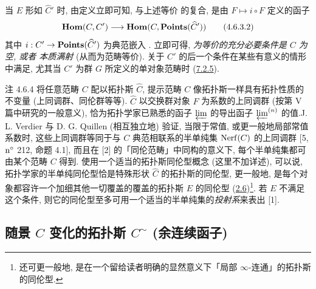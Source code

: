 当 $E$ 形如 $\widehat{C}'$ 时, 由定义立即可知,  与上述等价  的复合, 是由 $F\mapsto i\circ F$ 定义的函子
\begin{equation*}
\operatorname{\mathbf{Hom}}(C,C')\longrightarrow
\operatorname{\mathbf{Hom}}(C,\operatorname{\mathbf{Points}}(\widehat{C}'))\tag{4.6.3.2}
\end{equation*}
其中 $i:C'\rightarrow\operatorname{\mathbf{Points}}(\widehat{C}')$ 为典范嵌入 . 立即可得, \emph{ 为等价的充分必要条件是 $C$ 为空, 或者  本质满射} (从而为范畴等价). 关于 $C'$ 的后一个条件在某些有意义的情形中满足, 尤其当 $C'$ 为群 $G$ 所定义的单对象范畴时 (\hyperref[IV.subsubsec7.2.5]{7.2.5}).





\begin{enonce*}[remark]{注 4.6.4}
将任意范畴 $C$ 配以拓扑斯 $\widehat{C}$, 提示范畴 $C$ 像拓扑斯一样具有拓扑性质的不变量 (上同调群、同伦群等等). $\widehat{C}$ 以交换群对象 $F$ 为系数的上同调群 (按第 V 篇中研究的一般意义), 恰为拓扑学家已熟悉的函子 $\varprojlim$ 的导出函子 $\varprojlim^{(n)}$ 的值.\pageoriginale J. L. Verdier 与 D. G. Quillen (相互独立地) 验证, 当限于常值, 或更一般地局部常值系数时, 这些上同调群等同于与 $C$ 典范相联系的半单纯集 $\operatorname{Nerf}(C)$ 的上同调群 [5, ${\rm n^{\circ}}$ 212, 命题 4.1], 而且在 [2] 的「同伦范畴」中同构的意义下, 每个半单纯集都可由某个范畴 $C$ 得到. 使用一个适当的拓扑斯同伦型概念 (这里不加详述), 可以说, 拓扑学家的半单纯同伦型恰是特殊形状 $\widehat{C}$ 的拓扑斯的同伦型, 更一般地, 是每个对象都容许一个加细其他一切覆盖的覆盖的拓扑斯 $E$ 的同伦型 (\hyperref[IV.subsec2.6]{2.6})\footnote[1]{还可更一般地, 是在一个留给读者明确的显然意义下「局部 $\infty$-连通」的拓扑斯的同伦型.}. 若 $E$ 不满足这个条件, 则它的同伦型至多可用一个适当的半单纯集的\emph{投射系}来表出 [1].
\end{enonce*}

\subsection{随景 $C$ 变化的拓扑斯 $C^{\sim}$ (余连续函子)}

